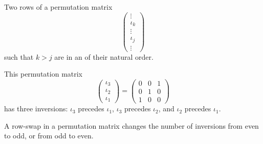 \begin{definition}
Two rows of a permutation matrix
\begin{equation*}
  \begin{pmatrix}
    \vdots          \\
    \iota_{k} \\
    \vdots          \\
    \iota_{j} \\
    \vdots
  \end{pmatrix}
\end{equation*}
such that \( k>j \) are in an %
of their natural order.
\end{definition}

\begin{example}
This permutation matrix
\begin{equation*}
  \begin{pmatrix}
    \iota_3  \\
    \iota_2  \\
    \iota_1
  \end{pmatrix}
  =
  \begin{pmatrix}
    0  &0  &1  \\
    0  &1  &0  \\
    1  &0  &0
  \end{pmatrix}
\end{equation*}
has three inversions: \( \iota_3 \) precedes \( \iota_1 \),
\( \iota_3 \) precedes \( \iota_2 \), and \( \iota_2 \) precedes
\( \iota_1 \).
\end{example}

\begin{lemma} \label{le:SwapsChangeSgn}
A row-swap in a permutation matrix changes the number of 
inversions from even to odd, or from odd to even.
\end{lemma}

